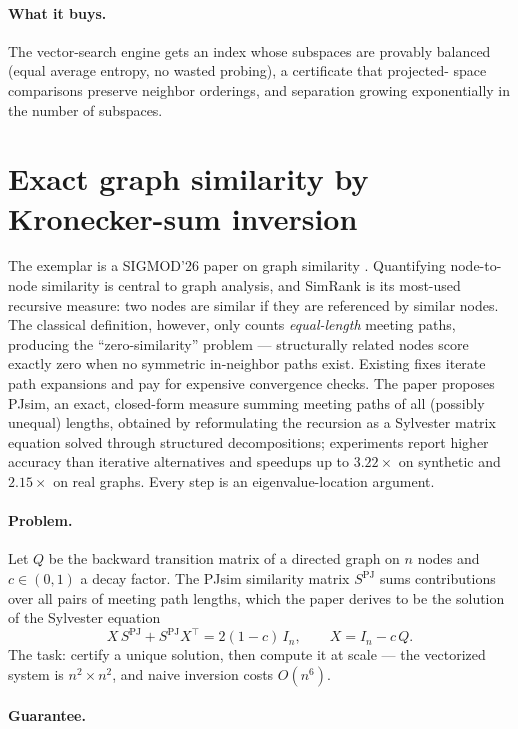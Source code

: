 \paragraph{What it buys.}
The vector-search engine gets an index whose subspaces are provably balanced
(equal average entropy, no wasted probing), a certificate that projected-
space comparisons preserve neighbor orderings, and separation growing
exponentially in the number of subspaces.

\section{Exact graph similarity by Kronecker-sum inversion}
\label{sec:spec-pjsim}

The exemplar is a SIGMOD'26 paper on graph similarity
\citep{sigmod26-190}. Quantifying node-to-node similarity is central to
graph analysis, and SimRank is its most-used recursive measure: two nodes
are similar if they are referenced by similar nodes. The classical
definition, however, only counts \emph{equal-length} meeting paths,
producing the ``zero-similarity'' problem --- structurally related nodes
score exactly zero when no symmetric in-neighbor paths exist. Existing
fixes iterate path expansions and pay for expensive convergence checks. The
paper proposes PJsim, an exact, closed-form measure summing meeting paths
of all (possibly unequal) lengths, obtained by reformulating the recursion
as a Sylvester matrix equation solved through structured decompositions;
experiments report higher accuracy than iterative alternatives and speedups
up to $3.22\times$ on synthetic and $2.15\times$ on real graphs. Every
step is an eigenvalue-location argument.

\paragraph{Problem.}
Let $Q$ be the backward transition matrix of a directed graph on $n$ nodes
and $c \in (0,1)$ a decay factor. The PJsim similarity matrix
$S^{\mathrm{PJ}}$ sums contributions over all pairs of meeting path lengths,
which the paper derives to be the solution of the Sylvester equation
\[
X\,S^{\mathrm{PJ}} + S^{\mathrm{PJ}} X^{\top} = 2(1-c)\,I_n,
\qquad X = I_n - c\,Q .
\]
The task: certify a unique solution, then compute it at scale --- the
vectorized system is $n^2 \times n^2$, and naive inversion costs $O(n^6)$.

\paragraph{Guarantee.}

